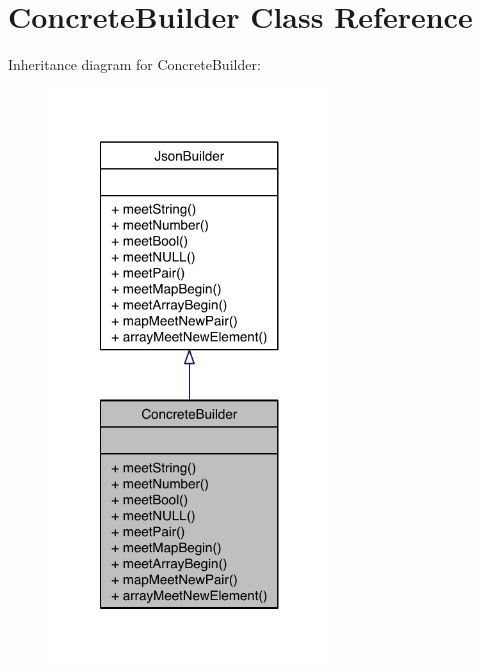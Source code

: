 \hypertarget{class_concrete_builder}{\section{Concrete\-Builder Class Reference}
\label{class_concrete_builder}
}


Inheritance diagram for Concrete\-Builder\-:\nopagebreak
\begin{figure}[H]
\begin{center}
\leavevmode
\includegraphics[width=212pt]{class_concrete_builder__inherit__graph}
\end{center}
\end{figure}



